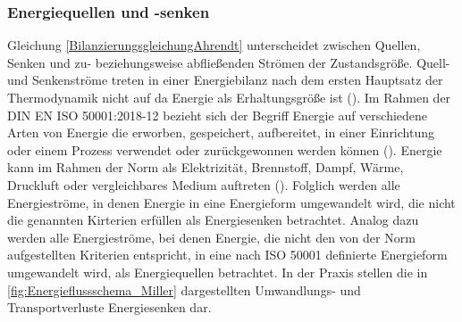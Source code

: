 \subsubsection{Energiequellen und -senken}
Gleichung \eqref{BilanzierungsgleichungAhrendt} unterscheidet zwischen Quellen, Senken und zu- beziehungsweise abfließenden Strömen der Zustandsgröße. 
Quell- und Senkenströme treten in einer Energiebilanz nach dem ersten Hauptsatz der Thermodynamik nicht auf da Energie als Erhaltungsgröße ist (\cite[S. 14]{Ahrendts.2014}). 
Im Rahmen der DIN EN ISO 50001:2018-12 bezieht sich der Begriff Energie auf verschiedene Arten von Energie die erworben, gespeichert, aufbereitet, in einer Einrichtung oder einem Prozess verwendet 
oder zurückgewonnen werden können (\cite[Kapitel 3.5.1]{DIN50001.2018}). Energie kann im Rahmen der Norm als Elektrizität, Brennstoff, Dampf, Wärme, Druckluft oder vergleichbares Medium auftreten 
(\cite[Kapitel 3.5.1]{DIN50001.2018}).
Folglich werden alle Energieströme, in denen Energie in eine Energieform umgewandelt wird, die nicht die genannten Kirterien erfüllen als Energiesenken betrachtet. 
Analog dazu werden alle Energieströme, bei denen Energie, die nicht den von der Norm aufgestellten Kriterien entspricht, in eine nach ISO 50001 definierte Energieform 
umgewandelt wird, als Energiequellen betrachtet.
In der Praxis stellen die in \eqref{fig:Energieflussschema_Miller} dargestellten Umwandlungs- und Transportverluste Energiesenken dar.


